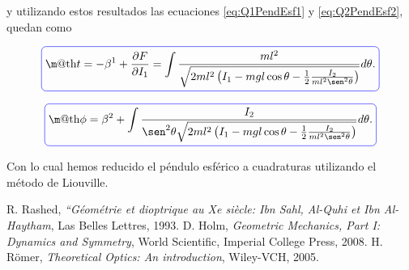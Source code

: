 \documentclass[a4paper,10pt]{article}
\makeatletter
\numberwithin{equation}{section}
\newcommand*{\boxcolor}{blue}
\renewcommand{\boxed}[1]{\textcolor{\boxcolor}{%
\tikz[baseline={([yshift=-1ex]current bounding box.center)}] \node [rectangle, minimum width=1ex,rounded corners,draw] {\normalcolor\m@th$\displaystyle#1$};}}
\makeatother
\begin{document}
y utilizando estos resultados las ecuaciones \eqref{eq:Q1PendEsf1} y \eqref{eq:Q2PendEsf2}, 
quedan como 

\begin{equation}
 \boxed{t = -\beta^1 + \frac{\partial F}{\partial I_1} = \int \frac{ml^2}{\sqrt{2ml^2\left(I_1 -
 mgl\cos{\theta} - \frac{1}{2}\frac{I_2}{ml^2\sen^2{\theta}} \right)}}d\theta.}
\end{equation}

\begin{equation}
 \boxed{\phi = \beta^2 + \int \frac{I_2}{\sen^2{\theta}\sqrt{2ml^2\left(I_1 - mgl\cos{\theta} - 
 \frac{1}{2}\frac{I_2}{ml^2\sen^2{\theta}} \right)}}d\theta.}
\end{equation}

Con lo cual hemos reducido el péndulo esférico a cuadraturas utilizando el método 
de Liouville.

\begin{thebibliography}{10}
R. Rashed, \emph{“Géométrie et dioptrique au Xe siècle: Ibn Sahl, 
Al-Quhi et Ibn Al-Haytham}, Las Belles Lettres, 1993.
D. Holm, \emph{Geometric Mechanics, Part I: Dynamics and Symmetry}, World Scientific, 
Imperial College Press, 2008.
H. Römer, \emph{Theoretical Optics: An introduction}, Wiley-VCH, 2005.
\end{thebibliography}
\end{document}
